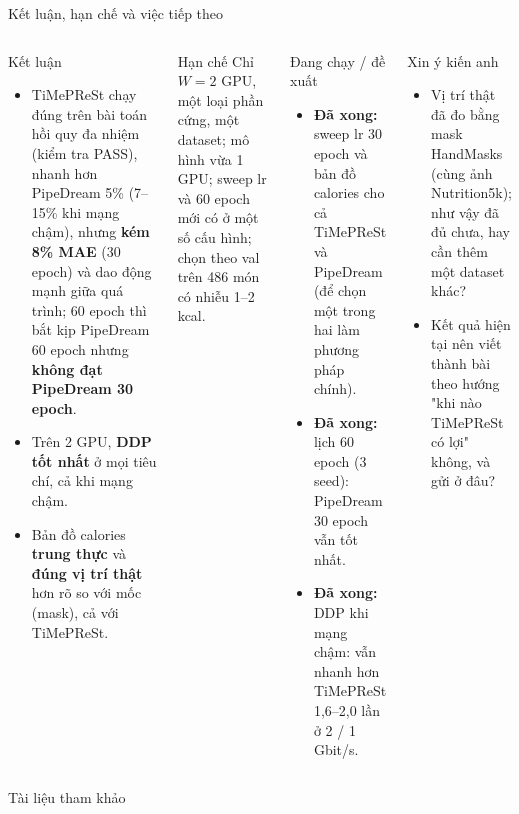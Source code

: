 \documentclass[10pt,aspectratio=169]{beamer}
\newcommand{\highlight}[1]{\textcolor{accent}{\bfseries #1}}
\newcommand{\kw}[1]{\textcolor{uitblue}{\bfseries #1}}
\begin{document}
\begin{frame}{Kết luận, hạn chế và việc tiếp theo}
\begin{columns}[T]
\begin{uitbox}{\faFlag\; Kết luận}
\scriptsize
\begin{itemize}
  \item TiMePReSt chạy đúng trên bài toán hồi quy đa nhiệm (kiểm tra PASS), nhanh hơn PipeDream 5\% (7--15\% khi mạng chậm), nhưng \highlight{kém 8\% MAE} (30 epoch) và dao động mạnh giữa quá trình; 60 epoch thì bắt kịp PipeDream 60 epoch nhưng \highlight{không đạt PipeDream 30 epoch}.
  \item Trên 2 GPU, \highlight{DDP tốt nhất} ở mọi tiêu chí, cả khi mạng chậm.
  \item Bản đồ calories \highlight{trung thực} và \highlight{đúng vị trí thật} hơn rõ so với mốc (mask), cả với TiMePReSt.
\end{itemize}
\end{uitbox}
\vspace{0.1cm}
\begin{accentbox}{\faExclamationTriangle\; Hạn chế}
\scriptsize
Chỉ $W = 2$ GPU, một loại phần cứng, một dataset; mô hình vừa 1 GPU; sweep lr và 60 epoch mới có ở một số cấu hình; chọn theo val trên 486 món có nhiễu 1--2 kcal.
\end{accentbox}

\begin{greenbox}{\faTasks\; Đang chạy / đề xuất}
\scriptsize
\begin{itemize}
  \item \kw{Đã xong:} sweep lr 30 epoch và bản đồ calories cho cả TiMePReSt và PipeDream (để chọn một trong hai làm phương pháp chính).
  \item \kw{Đã xong:} lịch 60 epoch (3 seed): PipeDream 30 epoch vẫn tốt nhất.
  \item \kw{Đã xong:} DDP khi mạng chậm: vẫn nhanh hơn TiMePReSt 1,6--2,0 lần ở 2 / 1 Gbit/s.
\end{itemize}
\end{greenbox}
\vspace{0.1cm}
\begin{uitbox}{\faQuestionCircle\; Xin ý kiến anh}
\scriptsize
\begin{itemize}
  \item Vị trí thật đã đo bằng mask HandMasks (cùng ảnh Nutrition5k); như vậy đã đủ chưa, hay cần thêm một dataset khác?
  \item Kết quả hiện tại nên viết thành bài theo hướng "khi nào TiMePReSt có lợi" không, và gửi ở đâu?
\end{itemize}
\end{uitbox}
\end{columns}
\end{frame}

\begin{frame}[allowframebreaks]{Tài liệu tham khảo}
\tiny
\nocite{dpfnutrition,rdinet,igsmnet}


\end{frame}
\end{document}
